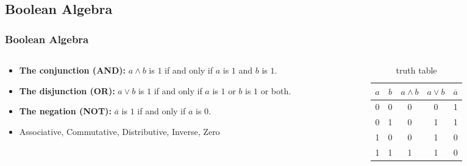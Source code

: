 \documentclass{beamer}
\begin{document}
\subsection{Boolean Algebra}
\begin{frame}\frametitle{Boolean Algebra}
  \begin{columns}
  \begin{column}{6cm}
  \begin{itemize}
    \item<1-> \textbf{The conjunction (AND):} $a\land b$ is $1$ if and only if $a$ is $1$ and $b$ is $1$.\\
    \item<1->  \textbf{The disjunction (OR):} $a\lor b$  is $1$ if and only if $a$ is $1$ or $b$ is $1$ or both.\\
    \item<1->  \textbf{The negation (NOT):}  $\overline{a}$ is $1$ if and only if $a$ is $0$.
    \item<2->  Associative, Commutative, Distributive, Inverse, Zero
  \end{itemize}
  \end{column}
  
    
  \begin{column}{6cm}
  \begin{table}[H]
  \centering
  \begin{tabular}{c|c||c|c|c}
  \textbf{$a$} & \textbf{$b$} & \textbf{$a\land b$} & \textbf{$a\lor b$} & \textbf{$\overline{a}$} \\ \hline
  0          & 0          & 0            & 0            & 1           \\
  0          & 1          & 0            & 1            & 1           \\
  1          & 0          & 0            & 1            & 0           \\
  1          & 1          & 1            & 1            & 0          
  \end{tabular}
  \caption{truth table}
  \label{tab:truth}
  \end{table}
  \end{column}
  
  \end{columns}
\end{frame}
\end{document}
